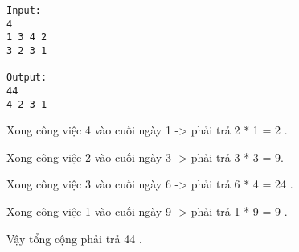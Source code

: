\begin{verbatim}
Input:
4
1 3 4 2
3 2 3 1

Output:
44
4 2 3 1 

\end{verbatim}

Xong công việc 4 vào cuối ngày 1 -> phải trả 2 * 1 = 2 .


Xong công việc 2 vào cuối ngày 3 -> phải trả 3 * 3 = 9.


Xong công việc 3 vào cuối ngày 6 -> phải trả 6 * 4 = 24 .


Xong công việc 1 vào cuối ngày 9 -> phải trả 1 * 9 = 9 .


Vậy tổng cộng phải trả 44 .